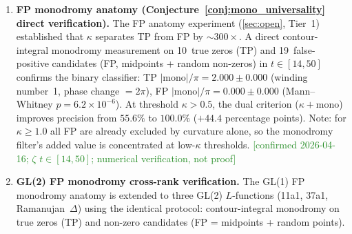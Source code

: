 \documentclass[11pt, a4paper]{article}
\theoremstyle{definition}
\theoremstyle{plain}
\begin{document}
\begin{enumerate}
        modular $L$-functions; the gate conditions should carry over
        with no modification beyond replacing the Riemann--Siegel
        $\vartheta$ by the appropriate theta function.
        \textcolor{ForestGreen}{[confirmed 2026-04-13: bundle properties
        verified for $\chi\bmod 3,4,5$; see \cref{app:dirichlet:verify}.]}
        \emph{Blind zero prediction
        \textcolor{ForestGreen}{[confirmed 2026-04-13]}:}
        Curvature-peak and monodromy-based detection on the unseen
        interval $t\in[25,40]$ achieves $\mathrm{F1}=1.000$ for all
        three characters ($\chi\bmod 3$, $\chi\bmod 4$, $\chi\bmod 5$):
        21/21 zeros detected with tolerance $\delta t<0.5$, every
        predicted point satisfying $|\mathrm{mono}|/\pi=1.0000$.
        See \cref{app:dirichlet:blind}.
        \emph{Cross-comparison (partial):} $\sigma=0.5$ uniqueness
        (phase jumps and energy concentration) confirmed for all four
        functions ($\zeta$ and three Dirichlet $L$-functions);
        curvature/monodromy comparison pending zero-finding fix.
  \item \textbf{FP monodromy anatomy (Conjecture~\ref{conj:mono_universality} direct verification).}
        The FP anatomy experiment (\cref{sec:open}, Tier~1) established
        that $\kappa$ separates TP from FP by ${\sim}300\times$.
        A direct contour-integral monodromy measurement on 10~true zeros
        (TP) and 19~false-positive candidates (FP, midpoints + random
        non-zeros) in $t\in[14,50]$ confirms the binary classifier:
        TP $|\mathrm{mono}|/\pi = 2.000 \pm 0.000$ (winding number~1,
        phase change $= 2\pi$), FP $|\mathrm{mono}|/\pi = 0.000 \pm 0.000$
        (Mann--Whitney $p = 6.2 \times 10^{-6}$).
        At threshold $\kappa > 0.5$, the dual criterion
        ($\kappa + \mathrm{mono}$) improves precision from $55.6\%$
        to $100.0\%$ ($+44.4$ percentage points).
        Note: for $\kappa \geq 1.0$ all FP are already excluded by
        curvature alone, so the monodromy filter's added value is
        concentrated at low-$\kappa$ thresholds.
        \textcolor{ForestGreen}{[confirmed 2026-04-16; $\zeta$ $t\in[14,50]$; numerical verification, not proof]}
  \item \textbf{GL(2) FP monodromy cross-rank verification.}
        The GL(1) FP monodromy anatomy is extended to three GL(2)
        $L$-functions (11a1, 37a1, Ramanujan~$\Delta$) using the
        identical protocol: contour-integral monodromy on true zeros
        (TP) and non-zero candidates (FP = midpoints + random points).

\end{enumerate}
\end{document}
